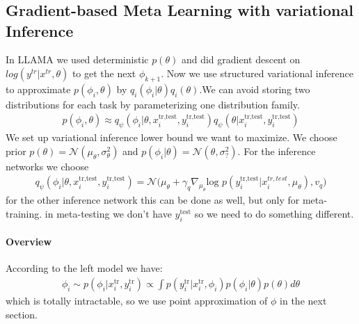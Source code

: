 \documentclass{article}
\begin{document}
	\section{}
	\subsection{Gradient-based Meta Learning with variational Inference}
	In LLAMA we used deterministic $p(\theta)$ and did gradient descent on $log(y^{tr} \vert x^{tr}, \theta)$ to get the next $\phi_{k+1}$. Now we use structured variational inference to approximate $p(\phi_i, \theta)$ by $q_i(\phi_i \vert \theta)q_i(\theta)$.We can avoid storing two distributions for each task by parameterizing one distribution family. 
	\begin{align}
		p(\phi_i, \theta) \approx q_{\psi}(\phi_i \vert \theta, x_i^{\text{tr,test}}, y_i^{\text{tr,test}}) q_{\psi}(\theta \vert x_i^{\text{tr,test}}, y_i^{\text{tr,test}})
	\end{align}
	We set up variational inference lower bound we want to maximize. We choose prior $p(\theta)= \mathcal{N}(\mu_{\theta}, \sigma_{\theta}^2)$ and $p(\phi_i \vert \theta)=\mathcal{N}(\theta, \sigma_{?}^2)$. For the inference networks we choose 
	\begin{align}
		q_{\psi}(\phi_i \vert \theta, x_i^{\text{tr,test}}, y_i^{\text{tr,test}}) = \mathcal{N}\Big( \mu_{\theta} + \gamma_{q} \nabla_{\mu_{\theta}} \text{log } p(y_i^{\text{tr,test}} \vert x_i^{tr,test}, \mu_{\theta}), v_q \Big)
	\end{align}
	for the other inference network this can be done as well, but only for meta-training. in meta-testing we don't have $y_i^{\text{test}}$ so we need to do something different.
	\paragraph{Overview} According to the left model we have:
	\begin{align}
		\phi_i \sim p(\phi_i \vert x_i^{\text{tr}}, y_i^{\text{tr}}) \propto \int p(y_i^{\text{tr}} \vert x_i^{\text{tr}}, \phi_i) p(\phi_i \vert \theta) p(\theta) d\theta
	\end{align}
	which is totally intractable, so we use point approximation of $\phi$ in the next section.
	
\end{document}

